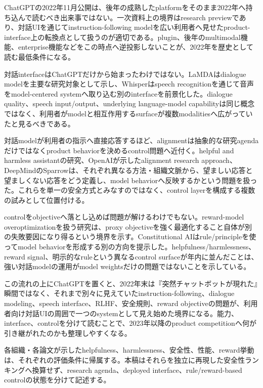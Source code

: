 
ChatGPTの2022年11月公開は、後年の成熟したplatformをそのまま2022年へ持ち込んで読むべき出来事ではない。一次資料上の境界はresearch previewであり、対話UIを通じてinstruction-following modelを広い利用者へ見せたproduct-interface上の転換点として扱うのが適切である。plugin、後年のmultimodal機能、enterprise機能などをこの時点へ逆投影しないことが、2022年を歴史として読む最低条件になる。\autocite{src-bc1a61aec959}


対話interfaceはChatGPTだけから始まったわけではない。LaMDAはdialogue modelを主要な研究対象として示し、Whisperはspeech recognitionを通じて音声をmodel-centered systemへ取り込む別のinterfaceを前景化した。dialogue quality、speech input/output、underlying language-model capabilityは同じ概念ではなく、利用者がmodelと相互作用するsurfaceが複数modalitiesへ広がっていたと見るべきである。\autocite{src-2a9e3cfb3148,src-2b132b9f05ef,src-7ef567047bd7}


対話modelが利用者の指示へ直接応答するほど、alignmentは抽象的な研究agendaだけではなくproduct behaviorを決めるcontrol問題へ近付く。helpful and harmless assistantの研究、OpenAIが示したalignment research approach、DeepMindのSparrowは、それぞれ異なる方法・組織文脈から、望ましい応答と望ましくない応答をどう定義し、model behaviorへ反映するかという問題を扱った。これらを単一の安全方式とみなすのではなく、control layerを構成する複数の試みとして位置付ける。\autocite{src-81cf88ab9c36,src-ce2ca3d4fe8f,src-d7f602cae828}


controlをobjectiveへ落とし込めば問題が解けるわけでもない。reward-model overoptimizationを扱う研究は、proxy objectiveを強く最適化すること自体が別の失敗要因になり得るという境界を示す。Constitutional AIはrule/principleを使ってmodel behaviorを形成する別の方向を提示した。helpfulness/harmlessness、reward signal、明示的なruleという異なるcontrol surfaceが年内に並んだことは、強い対話modelの運用がmodel weightsだけの問題ではないことを示している。\autocite{src-1a032a768300,src-83ce66a102c3,src-ce2ca3d4fe8f,src-f4ecc26bd1e5}


この流れの上にChatGPTを置くと、2022年末は『突然チャットボットが現れた』瞬間ではなく、それまで別々に見えていたinstruction-following、dialogue modeling、speech interface、RLHF、安全規則、reward objectiveの問題が、利用者向け対話UIの周囲で一つのsystemとして見え始めた境界になる。能力、interface、controlを分けて読むことで、2023年以降のproduct competitionへ何が引き継がれたのかも整理しやすくなる。\autocite{src-1a032a768300,src-2a9e3cfb3148,src-2b132b9f05ef,src-7ef567047bd7,src-81cf88ab9c36,src-83ce66a102c3,src-bc1a61aec959,src-ce2ca3d4fe8f,src-d7f602cae828,src-f4ecc26bd1e5}


\begin{claimboundary}
各組織・各論文が示したhelpfulness、harmlessness、安全性、性能、reward挙動は、それぞれの評価条件に帰属する。本稿はそれらを独立に再現した安全性ランキングへ換算せず、research agenda、deployed interface、rule/reward-based controlの状態を分けて記述する。\autocite{src-1a032a768300,src-83ce66a102c3,src-f4ecc26bd1e5}
\end{claimboundary}
